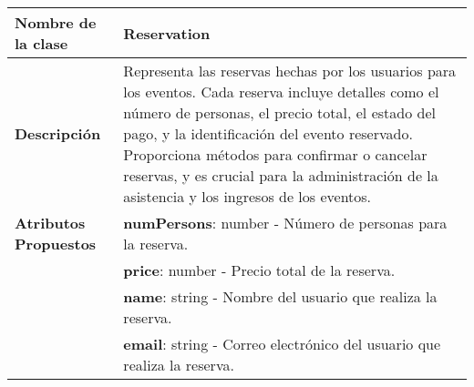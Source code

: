 \begin{clases}
	\centering
\begin{tabular}{|>{\raggedright\arraybackslash}p{4cm}|p{12cm}|}
		\hline
		\textbf{Nombre de la clase}   & \textbf{Reservation}                                                                                                                                                                                                                                                                                                                                   \\
		\hline
		\textbf{Descripción}          & Representa las reservas hechas por los usuarios para los eventos. Cada reserva incluye detalles como el número de personas, el precio total, el estado del pago, y la identificación del evento reservado. Proporciona métodos para confirmar o cancelar reservas, y es crucial para la administración de la asistencia y los ingresos de los eventos. \\
		\hline
		\textbf{Atributos Propuestos} & \textbf{numPersons}: number - Número de personas para la reserva.                                                                                                                                                                                                                                                                                      \\
		                              & \textbf{price}: number - Precio total de la reserva.                                                                                                                                                                                                                                                                                                   \\
		                              & \textbf{name}: string - Nombre del usuario que realiza la reserva.                                                                                                                                                                                                                                                                                     \\
		                              & \textbf{email}: string - Correo electrónico del usuario que realiza la reserva.                                                                                                                                                                                                                                                                        \\

\end{tabular}
\end{clases}

